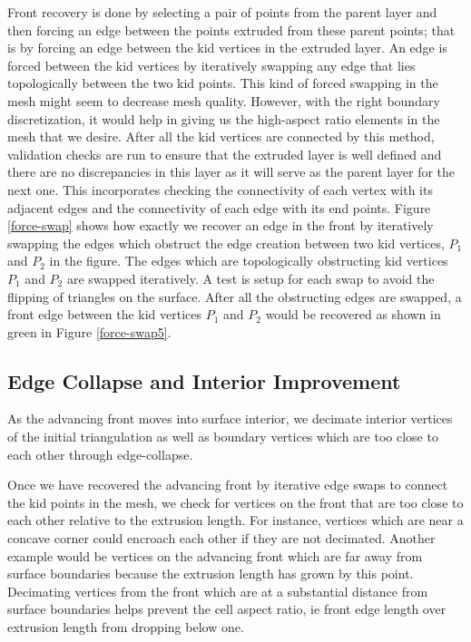 \documentclass[conf]{new-aiaa}
\begin{document}
Front recovery is done by selecting a pair of points from the parent layer and then forcing an edge between the points extruded from these parent points; that is by forcing an edge between the kid vertices in the extruded layer. An edge is forced between the kid vertices by iteratively swapping any edge that lies topologically between the two kid points. This kind of forced swapping in the mesh might seem to decrease mesh quality. However, with the right boundary discretization, it would help in giving us the high-aspect ratio elements in the mesh that we desire. After all the kid vertices are connected by this method, validation checks are run to ensure that the extruded layer is well defined and there are no discrepancies in this layer as it will serve as the parent layer for the next one. This incorporates checking the connectivity of each vertex with its adjacent edges and the connectivity of each edge with its end points. Figure \ref{force-swap} shows how exactly we recover an edge in the front by iteratively swapping the edges which obstruct the edge creation between two kid vertices, $P_1$ and $P_2$ in the figure. The edges which are topologically obstructing kid vertices $P_1$ and $P_2$ are swapped iteratively. A test is setup for each swap to avoid the flipping of triangles on the surface. After all the obstructing edges are swapped, a front edge between the kid vertices $P_1$ and $P_2$ would be recovered as shown in green in Figure \ref{force-swap5}.

\subsection{Edge Collapse and Interior Improvement}

As the advancing front moves into surface interior, we decimate interior vertices of the initial triangulation as well as boundary vertices which are too close to each other through edge-collapse.

Once we have recovered the advancing front by iterative edge swaps to connect the kid points in the mesh, we check for vertices on the front that are too close to each other relative to the extrusion length. For instance, vertices which are near a concave corner could encroach each other if they are not decimated. Another example would be vertices on the advancing front which are far away from surface boundaries because the extrusion length has grown by this point. Decimating vertices from the front which are at a substantial distance from surface boundaries helps prevent the cell aspect ratio, ie front edge length over extrusion length from dropping below one.
\end{document}

